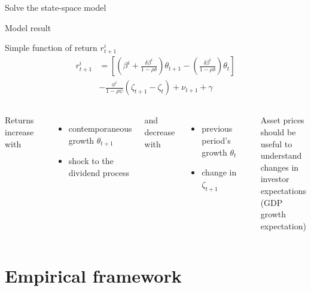 \documentclass[UTF8, 16pt]{beamer}
\begin{document}
\begin{CJK*}{UTF8}{gbsn}
\begin{frame}{Solve the state-space model}
\end{frame}
\begin{frame}{Model result}
	\begin{alertblock}{Simple function of return $r^{i}_{t+1}$}
		$$
		\begin{aligned}
			r_{t+1}^{i}&=\left[\left(\beta^{i}+\frac{\delta \beta^{i}}{1-\rho \delta}\right) \theta_{t+1}-\left(\frac{\delta \beta^{i}}{1-\rho \delta}\right) \theta_{t}\right]
		\\&-\frac{\phi^{i}}{1-\rho \psi}\left(\zeta_{t+1}-\zeta_{t}\right)+\nu_{t+1}+\gamma
		\end{aligned}
		$$
	\end{alertblock}
	\begin{columns}
			Returns increase with 
			\begin{itemize}
				\item contemporaneous growth $\theta_{t+1}$
				\item shock to the dividend process
			\end{itemize}
			and decrease with
			\begin{itemize}
				\item previous period's growth $\theta_t$
				\item change in $\zeta_{t+1}$
			\end{itemize}
		\alert{Asset prices}
		\\ should be useful to 
		\\ understand changes in 
		\\ \alert{investor expectations}
			\\ (GDP growth expectation)
	\end{columns}
\end{frame}

\section{Empirical framework}

\end{CJK*}
\end{document}
